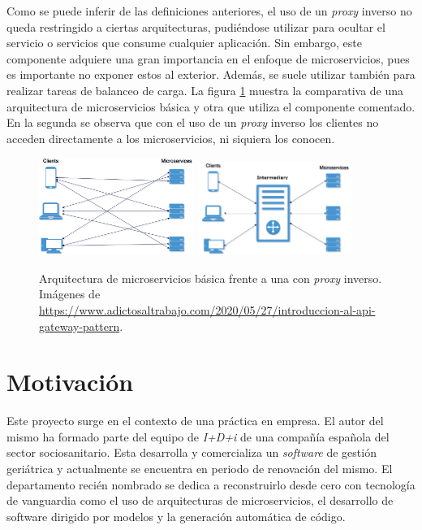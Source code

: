 \documentclass[11pt,spanish,listoffigures]{tfgetsinf}
\begin{document}
Como se puede inferir de las definiciones anteriores, el uso de un \emph{proxy} inverso no queda restringido a ciertas arquitecturas, pudiéndose utilizar para ocultar el servicio o servicios que consume cualquier aplicación. Sin embargo, este componente adquiere una gran importancia en el enfoque de microservicios, pues es importante no exponer estos al exterior. Además, se suele utilizar también para realizar tareas de balanceo de carga. La figura \ref{figura:proxyInverso_o_no} muestra la comparativa de una arquitectura de microservicios básica y otra que utiliza el componente comentado. En la segunda se observa que con el uso de un \emph{proxy} inverso los clientes no acceden directamente a los microservicios, ni siquiera los conocen.

\begin{figure}[ht]
	\centering
	\label{figura:proxyInverso_o_no}
	\includegraphics[width=0.45\textwidth]{images/arquitecturaMicroserviciosBasica}
	\includegraphics[width=0.45\textwidth]{images/arquitecturaMicroserviciosConProxyInverso}
	\caption{Arquitectura de microservicios básica frente a una con \emph{proxy} inverso. Imágenes de \url{https://www.adictosaltrabajo.com/2020/05/27/introduccion-al-api-gateway-pattern}.}
\end{figure}

\section{Motivación}

Este proyecto surge en el contexto de una práctica en empresa. El autor del mismo ha formado parte del equipo de \emph{I+D+i} de una compañía española del sector sociosanitario. Esta desarrolla y comercializa un \emph{software} de gestión geriátrica y actualmente se encuentra en periodo de renovación del mismo. El departamento recién nombrado se dedica a reconstruirlo desde cero con tecnología de vanguardia como el uso de arquitecturas de microservicios, el desarrollo de software dirigido por modelos y la generación automática de código.
\end{document}
